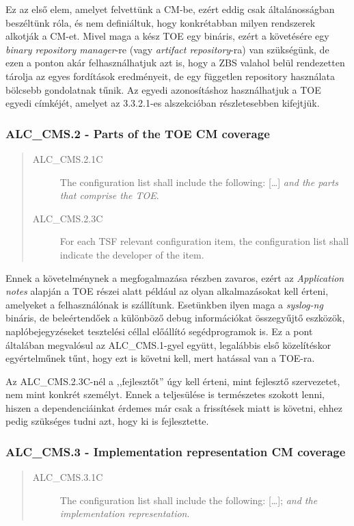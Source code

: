 Ez az első elem, amelyet felvettünk a CM-be, ezért eddig csak általánosságban beszéltünk róla, és
nem definiáltuk, hogy konkrétabban milyen rendszerek alkotják a CM-et.  Mivel maga a kész TOE egy
bináris, ezért a követésére egy \emph{binary repository manager}-re (vagy \emph{artifact
repository}-ra) van szükségünk, de ezen a ponton akár felhasználhatjuk azt is, hogy a ZBS valahol
belül rendezetten tárolja az egyes fordítások eredményeit, de egy független repository használata
bölcsebb gondolatnak tűnik.  Az egyedi azonosításhoz használhatjuk a TOE egyedi címkéjét, amelyet az
3.3.2.1-es alszekcióban részletesebben kifejtjük.

\pagebreak[3]
\subsubsection{ALC\_CMS.2 - Parts of the TOE CM coverage}
\begin{quote}
    \begin{description}
        \item[ALC\_CMS.2.1C]{The configuration list shall include the following: [\ldots] \emph{and
            the parts that comprise the TOE}.}
        \item[ALC\_CMS.2.3C]{For each TSF relevant configuration item, the configuration list shall
            indicate the developer of the item.}
    \end{description}
\end{quote}

Ennek a követelménynek a megfogalmazása részben zavaros, ezért az \emph{Application notes} alapján
a TOE részei alatt például az olyan alkalmazásokat kell érteni, amelyeket a felhasználónak is
szállítunk. Esetünkben ilyen maga a \emph{syslog-ng} bináris, de beleértendőek a különböző
debug információkat összegyűjtő eszközök, naplóbejegyzéseket tesztelési céllal előállító
segédprogramok is. Ez a pont általában megvalósul az ALC\_CMS.1-gyel együtt, legalábbis első
közelítéskor egyértelműnek tűnt, hogy ezt is követni kell, mert hatással van a TOE-ra.

Az ALC\_CMS.2.3C-nél a ,,fejlesztőt'' úgy kell érteni, mint fejlesztő szervezetet, nem mint konkrét
személyt. Ennek a teljesülése is természetes szokott lenni, hiszen a dependenciáinkat érdemes
már csak a frissítések miatt is követni, ehhez pedig szükséges tudni azt, hogy ki is fejlesztette.

\pagebreak[3]
\subsubsection{ALC\_CMS.3 - Implementation representation CM coverage}
\begin{quote}
    \begin{description}
        \item[ALC\_CMS.3.1C]{The configuration list shall include the following: [\ldots];
            \emph{and the implementation representation}.}
    \end{description}
\end{quote}

